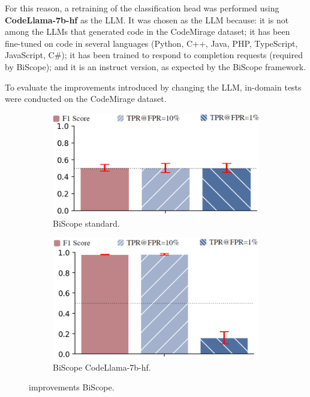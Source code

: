 For this reason, a retraining of the classification head was 
performed using \textbf{CodeLlama-7b-hf} \cite{roziere2023code} as the LLM.
It was chosen as the LLM because: it is not among the LLMs that generated 
code in the CodeMirage dataset; it has been fine-tuned on code in several 
languages (Python, C++, Java, PHP, TypeScript, JavaScript, C\#); it has been 
trained to respond to completion requests (required by BiScope); and it is an 
instruct version, as expected by the BiScope framework.

To evaluate the improvements introduced by changing the LLM, in-domain 
tests were conducted on the CodeMirage dataset.
\begin{figure}[H]
    \centering
    \begin{subfigure}[b]{0.45\textwidth}
        \centering
        \includegraphics[width=\linewidth]{img/BiScope/standard/CodemirageOverCodemirage.png}
        \caption{BiScope standard.}
        \label{fig:BiScope standard.}
    \end{subfigure}
    \hfill
    \begin{subfigure}[b]{0.45\textwidth}
        \centering
        \includegraphics[width=\linewidth]{img/BiScope/test_noramle_migliorato.png}
        \caption{BiScope CodeLlama-7b-hf.}
        \label{fig:BiScope CodeLlama-7b-hf.}
    \end{subfigure}
    \caption{improvements BiScope.}
    \label{fig:BiScope_improvements.}
\end{figure}

